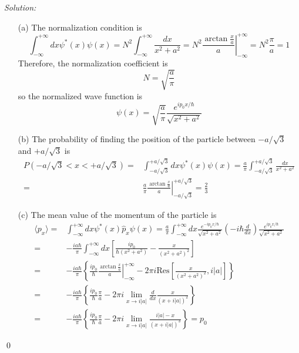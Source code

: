 \documentclass[12pt,a4paper]{article}
\newenvironment{sol}
    {\emph{Solution:}
    }
    {
    \qed
    }
\begin{document}
\begin{sol}
\begin{itemize}
\item[(a)] The normalization condition is
\begin{equation}
\int_{-\infty}^{+\infty}dx\psi^*(x)\psi(x)=N^2\int_{-\infty}^{+\infty}\frac{dx}{x^2+a^2}=N^2\left.\frac{\arctan\frac{x}{a}}{a}\right|_{-\infty}^{+\infty}=N^2\frac{\pi}{a}=1
\end{equation}
Therefore, the normalization coefficient is
\begin{equation}
N=\sqrt{\frac{a}{\pi}}
\end{equation}
so the normalized wave function is
\begin{equation}
\psi(x)=\sqrt{\frac{a}{\pi}}\frac{e^{ip_0x/\hbar}}{\sqrt{x^2+a^2}}
\end{equation}
\item[(b)] The probability of finding the position of the particle between $-a/\sqrt{3}$ and $+a/\sqrt{3}$ is
\begin{align}
\nonumber P(-a/\sqrt{3}<x<+a/\sqrt{3})=&\int_{-a/\sqrt{3}}^{+a/\sqrt{3}}dx\psi^*(x)\psi(x)=\frac{a}{\pi}\int_{-a/\sqrt{3}}^{+a/\sqrt{3}}\frac{dx}{x^2+a^2}\\
=&\frac{a}{\pi}\left.\frac{\arctan\frac{x}{a}}{a}\right|_{-a/\sqrt{3}}^{+a/\sqrt{3}}=\frac{2}{3}
\end{align}
\item[(c)] The mean value of the momentum of the particle is
\begin{align}
\nonumber\langle p_x\rangle=&\int_{-\infty}^{+\infty}dx\psi^*(x)\hat{p}_x\psi(x)=\frac{a}{\pi}\int_{-\infty}^{+\infty}dx\frac{e^{-ip_0x/\hbar}}{\sqrt{x^2+a^2}}(-i\hbar\frac{d}{dx})\frac{e^{ip_0x/\hbar}}{\sqrt{x^2+a^2}}\\
\nonumber=&-\frac{ia\hbar}{\pi}\int_{-\infty}^{+\infty}dx\left[\frac{ip_0}{\hbar(x^2+a^2)}-\frac{x}{(x^2+a^2)^2}\right]\\
\nonumber=&-\frac{ia\hbar}{\pi}\left\{\frac{ip_0}{\hbar}\left.\frac{\arctan\frac{x}{a}}{a}\right|_{-\infty}^{+\infty}-2\pi i\text{Res}\left[\frac{x}{(x^2+a^2)^2},i|a|\right]\right\}\\
\nonumber=&-\frac{ia\hbar}{\pi}\left\{\frac{ip_0}{\hbar}\frac{\pi}{a}-2\pi i\lim_{x\rightarrow i|a|}\frac{d}{dx}\frac{x}{(x+i|a|)^2}\right\}\\
=&-\frac{ia\hbar}{\pi}\left\{\frac{ip_0}{\hbar}\frac{\pi}{a}-2\pi i\lim_{x\rightarrow i|a|}\frac{i|a|-x}{(x+i|a|)^3}\right\}=p_0
\end{align}
\end{itemize}
\end{sol}
\end{document}
